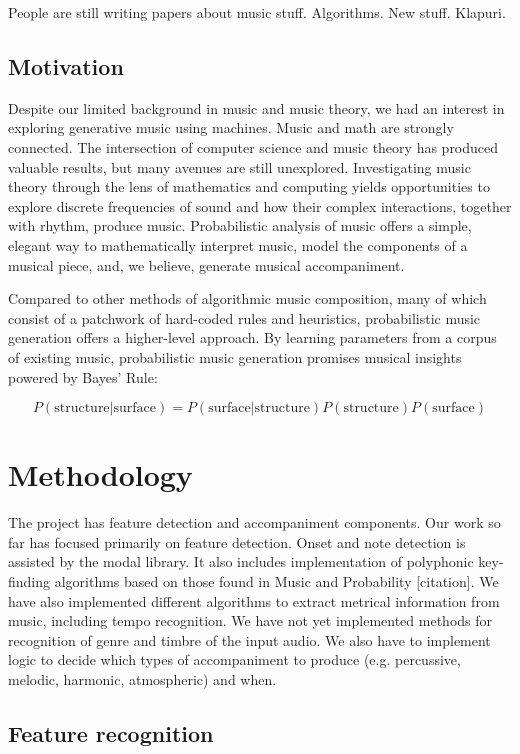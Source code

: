 \documentclass[11pt,conference,letterpaper]{IEEEtran}
\begin{document}
People are still writing papers about music stuff. Algorithms. New stuff. Klapuri.



\subsection{Motivation}

Despite our limited background in music and music theory, we had an interest in exploring generative music using machines. Music and math are strongly connected. The intersection of computer science and music theory has produced valuable results, but many avenues are still unexplored. Investigating music theory through the lens of mathematics and computing yields opportunities to explore discrete frequencies of sound and how their complex interactions, together with rhythm, produce music. Probabilistic analysis of music offers a simple, elegant way to mathematically interpret music, model the components of a musical piece, and, we believe, generate musical accompaniment.

Compared to other methods of algorithmic music composition, many of which consist of a patchwork of hard-coded rules and heuristics, probabilistic music generation offers a higher-level approach. By learning parameters from a corpus of existing music, probabilistic music generation promises musical insights powered by Bayes' Rule:

{\small
\[ P(\text{structure}|\text{surface}) = P(\text{surface}|\text{structure})P(\text{structure})P(\text{surface}) \]
}

\section{Methodology}

The project has feature detection and accompaniment components. Our work so far has focused primarily on feature detection. Onset and note detection is assisted by the modal library. It also includes implementation of polyphonic key-finding algorithms based on those found in Music and Probability [citation]. We have also implemented different algorithms to extract metrical information from music, including tempo recognition. We have not yet implemented methods for recognition of genre and timbre of the input audio. We also have to implement logic to decide which types of accompaniment to produce (e.g. percussive, melodic, harmonic, atmospheric) and when.

\subsection{Feature recognition}
\end{document}
